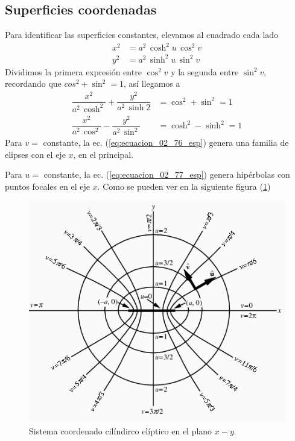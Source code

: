 \subsection{Superficies coordenadas}
Para identificar las superficies constantes, elevamos al cuadrado cada lado
\begin{align}
x^{2} &= a^{2} \, \cosh^{2} u \, \cos^{2} v \label{eq:ecuacion_02_74_esp} \\
y^{2} &= a^{2} \, \sinh^{2} u \, \sin^{2} v \label{eq:ecuacion_02_75_esp}
\end{align}
Dividimos la primera expresión entre $\cos^{2} v$ y la segunda entre $\sin^{2} v$, recordando que $cos^{2} + \sin^{2} = 1$, así llegamos a
\begin{align}
\dfrac{x^{2}}{a^{2} \, \cosh^{2}} + \dfrac{y^{2}}{a^{2} \, \sinh{2}} &= \cos^{2} + \sin^{2} = 1 \label{eq:ecuacion_02_76_esp}\\[1em]
\dfrac{x^{2}}{a^{2} \, \cos^{2}} - \dfrac{y^{2}}{a^{2} \, \sin^{2}} &= \cosh^{2} - \sinh^{2} = 1 \label{eq:ecuacion_02_77_esp}
\end{align}
Para $v=$ constante, la ec. (\ref{eq:ecuacion_02_76_esp}) genera una familia de elipses con el eje $x$, en el principal.
\par
Para $u=$ constante, la ec. (\ref{eq:ecuacion_02_77_esp}) genera hipérbolas con puntos focales en el eje $x$. Como se pueden ver en la siguiente figura (\ref{fig:figura_coordenada_cilindricas_elipticas})
\begin{figure}[H]
    \centering
    \includegraphics[scale=0.5]{Imagenes/EllipticCylindricalCoord_1000.png}
    \caption{Sistema coordenado cilíndirco elíptico en el plano $x-y$.}
    \label{fig:figura_coordenada_cilindricas_elipticas}
\end{figure}
